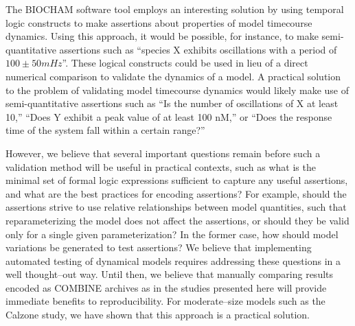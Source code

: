 \documentclass[10pt,letterpaper]{article}
\begin{document}
The BIOCHAM software tool \cite{calzone2006biocham} employs an interesting solution by using temporal logic constructs to make assertions about properties of model timecourse dynamics. Using this approach, it would be possible, for instance, to make semi-quantitative assertions such as ``species X exhibits oscillations with a period of $100 \pm 50 mHz$''. These logical constructs could be used in lieu of a direct numerical comparison to validate the dynamics of a model. A practical solution to the problem of validating model timecourse dynamics would likely make use of semi-quantitative assertions such as ``Is the number of oscillations of X at least 10,'' ``Does Y exhibit a peak value of at least 100 nM,'' or ``Does the response time of the system fall within a certain range?''

However, we believe that several important questions remain before such a validation method will be useful in practical contexts, such as what is the minimal set of formal logic expressions sufficient to capture any useful assertions, and what are the best practices for encoding assertions? For example, should the assertions strive to use relative relationships between model quantities, such that reparameterizing the model does not affect the assertions, or should they be valid only for a single given parameterization? In the former case, how should model variations be generated to test assertions? We believe that implementing automated testing of dynamical models requires addressing these questions in a well thought--out way. Until then, we believe that manually comparing results encoded as COMBINE archives as in the studies presented here will provide immediate benefits to reproducibility. For moderate--size models such as the Calzone study, we have shown that this approach is a practical solution.

\end{document}
